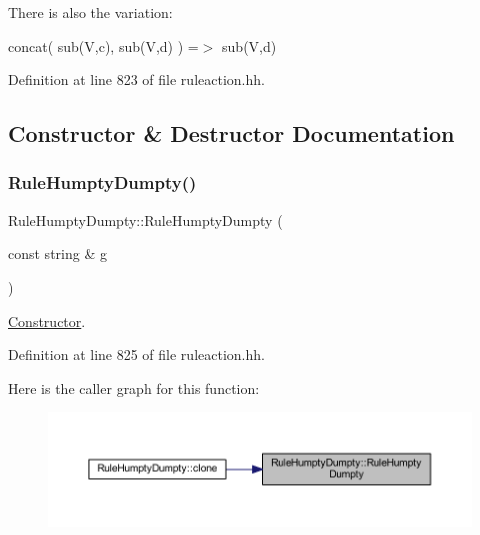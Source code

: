 There is also the variation\+:
\begin{DoxyItemize}
\item {\ttfamily concat( sub(\+V,c), sub(\+V,d) ) =$>$ sub(\+V,d)} 
\end{DoxyItemize}

Definition at line 823 of file ruleaction.\+hh.



\subsection{Constructor \& Destructor Documentation}
\mbox{\label{class_rule_humpty_dumpty_a7f2b3a7bbb13035c4df221e0d8a889e2}} 
\subsubsection{\texorpdfstring{RuleHumptyDumpty()}{RuleHumptyDumpty()}}
{\footnotesize\ttfamily Rule\+Humpty\+Dumpty\+::\+Rule\+Humpty\+Dumpty (\begin{DoxyParamCaption}\item[{const string \&}]{g }\end{DoxyParamCaption})\hspace{0.3cm}{\ttfamily [inline]}}



\mbox{\hyperlink{class_constructor}{Constructor}}. 



Definition at line 825 of file ruleaction.\+hh.

Here is the caller graph for this function\+:
\nopagebreak
\begin{figure}[H]
\begin{center}
\leavevmode
\includegraphics[width=350pt]{class_rule_humpty_dumpty_a7f2b3a7bbb13035c4df221e0d8a889e2_icgraph}
\end{center}
\end{figure}


